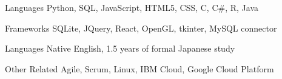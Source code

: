 

\begin{cvskills}

  \cvskill
    {Languages} %
    {Python, SQL, JavaScript, HTML5, CSS, C, C\#, R, Java} %

  \cvskill
    {Frameworks} %
    {SQLite, JQuery, React, OpenGL, tkinter, MySQL connector} %

  \cvskill
    {Languages} %
    {Native English, 1.5 years of formal Japanese study} %

  \cvskill
    {Other Related} %
    {Agile, Scrum, Linux, IBM Cloud, Google Cloud Platform} %

\end{cvskills}
